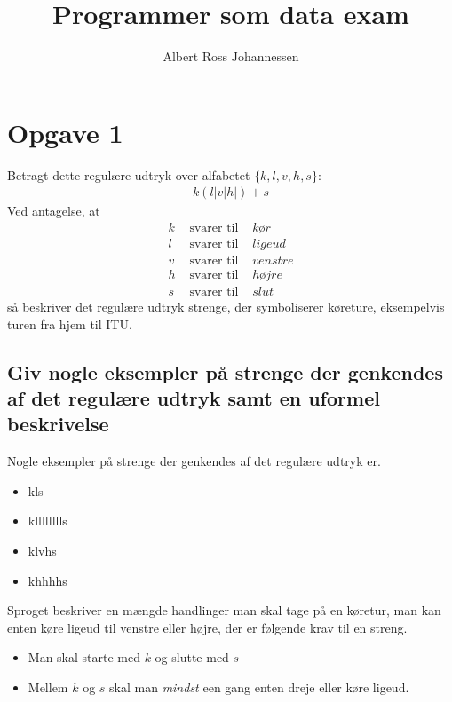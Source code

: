\documentclass[11pt,a4paper]{article}
\begin{document}
\begin{titlepage}
    \title{Programmer som data exam}
    \author{Albert Ross Johannessen}
    \maketitle
  \end{titlepage}
  
\pagestyle{fancy}
\fancyhf{}
\section{Opgave 1}
Betragt dette regulære udtryk over alfabetet $\{k,l,v,h,s\}$:
\begin{align*}
    k(l|v|h|)+s
\end{align*}
Ved antagelse, at
\begin{align*}
    k & \text{ svarer til } & kør\\
    l & \text{ svarer til } & ligeud\\
    v & \text{ svarer til } & venstre\\
    h & \text{ svarer til } & højre\\
    s & \text{ svarer til } & slut
\end{align*}
så beskriver det regulære udtryk strenge, der symboliserer køreture, eksempelvis turen fra hjem til ITU.\@
\subsection{Giv nogle eksempler på strenge der genkendes af det regulære udtryk samt en uformel beskrivelse}
Nogle eksempler på strenge der genkendes af det regulære udtryk er.
\begin{itemize}
    \item kls
    \item klllllllls
    \item klvhs
    \item khhhhs
\end{itemize}
Sproget beskriver en mængde handlinger man skal tage på en køretur, man kan enten køre ligeud til venstre eller højre, der er følgende krav til en streng.
\begin{itemize}
    \item Man skal starte med $k$ og slutte med $s$
    \item Mellem $k$ og $s$ skal man \textit{mindst} een gang enten dreje eller køre ligeud.
\end{itemize}
\end{document}
